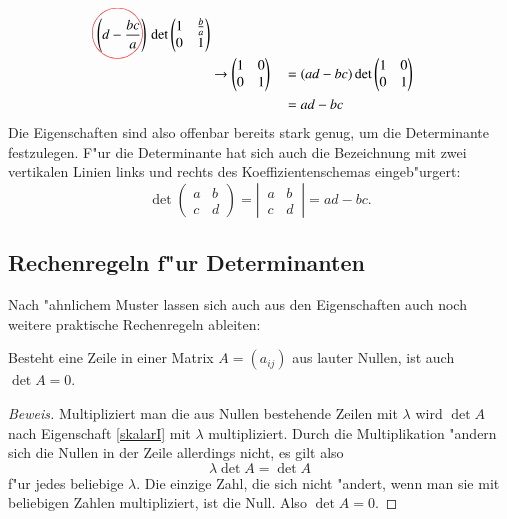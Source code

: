 \begin{align*}
\;
\left(d-\frac{bc}a\right)%
\begin{picture}(0,0)
\color{red}\put(-22.5,4){\circle{35}}
\end{picture}%
\det\begin{pmatrix}1&\frac{b}{a}\\0&1\end{pmatrix}
\\
&\rightarrow
\begin{pmatrix}1&0\\0&1\end{pmatrix}
&
&=(ad-bc)
\det \begin{pmatrix}1&0\\0&1\end{pmatrix}
\\
&&&=ad-bc
\end{align*}
Die Eigenschaften sind also offenbar bereits stark genug, um die
Determinante festzulegen.
F"ur die Determinante hat sich auch die
Bezeichnung mit zwei vertikalen Linien links und rechts des
Koeffizientenschemas eingeb"urgert:
\[
\det\begin{pmatrix}a&b\\c&d\end{pmatrix}
=
\left|\,\begin{matrix}a&b\\c&d\end{matrix}\,\right|
=
ad-bc.
\]

\subsection{Rechenregeln f"ur Determinanten}
Nach "ahnlichem Muster lassen sich auch aus den Eigenschaften auch
noch weitere praktische Rechenregeln ableiten:

\begin{hilfssatz}
Besteht eine Zeile in einer Matrix $A=(a_{ij})$ aus
lauter Nullen, ist auch $\det A=0$.
\label{nullzeile}
\end{hilfssatz}

\begin{proof}[Beweis]
Multipliziert man die aus Nullen bestehende Zeilen mit $\lambda$
wird $\det A$ nach Eigenschaft \ref{skalarI}  mit $\lambda$ multipliziert.
Durch die Multiplikation "andern sich die Nullen in der Zeile allerdings
nicht, es gilt also
\[
\lambda \det A=\det A
\]
f"ur jedes beliebige $\lambda$.
Die einzige Zahl, die sich nicht "andert,
wenn man sie mit beliebigen Zahlen multipliziert, ist die Null.
Also $\det A=0$.
\end{proof}

